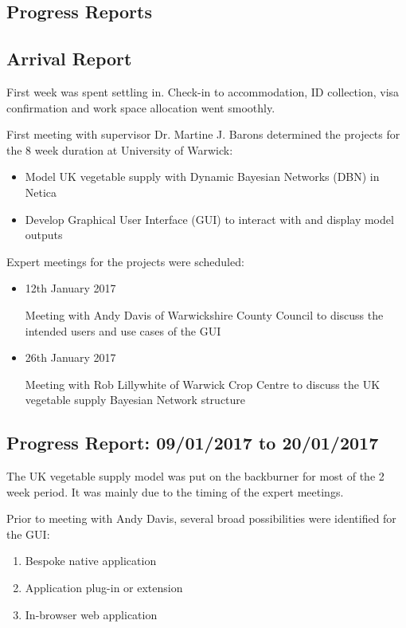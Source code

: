 \documentclass[12pt,notitlepage]{article}
\begin{document}
\begin{multicols}{2}
\section{Progress Reports}\label{sec:progress}
\subsection{Arrival Report}\label{subsec:arrival}
First week was spent settling in. Check-in to accommodation, ID collection, visa confirmation and work space allocation went smoothly. 

First meeting with supervisor Dr. Martine J. Barons determined the projects for the 8 week duration at University of Warwick:
\begin{itemize}
\item Model UK vegetable supply with Dynamic Bayesian Networks (DBN) in Netica
\item Develop Graphical User Interface (GUI) to interact with and display model outputs
\end{itemize}
Expert meetings for the projects were scheduled:
\begin{itemize}
\item 12th January 2017

Meeting with Andy Davis of Warwickshire County Council to discuss the intended users and use cases of the GUI
\item 26th January 2017

Meeting with Rob Lillywhite of Warwick Crop Centre to discuss the UK vegetable supply Bayesian Network structure
\end{itemize}

\subsection{Progress Report: 09/01/2017 to 20/01/2017}\label{subsec:progress1}
The UK vegetable supply model was put on the backburner for most of the 2 week period. It was mainly due to the timing of the expert meetings.

Prior to meeting with Andy Davis, several broad possibilities were identified for the GUI:
\begin{enumerate}[label=(\Alph*)]
\itemsep0em 
\item Bespoke native application
\item Application plug-in or extension
\item In-browser web application
\end{enumerate}


\end{multicols}
\end{document}
